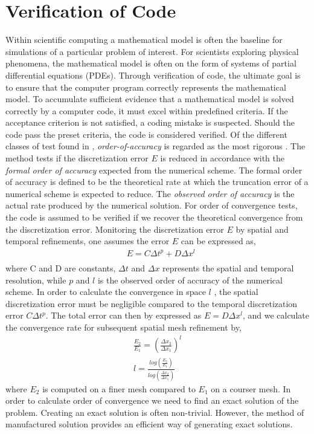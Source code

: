 \section{Verification of Code}
Within scientific computing a mathematical model is often the baseline for simulations of a particular problem of interest. For scientists exploring physical phenomena, the mathematical model is often on the form of systems of partial differential equations (PDEs). Through verification of code, the ultimate goal is to ensure that the computer program correctly represents the mathematical model. To accumulate sufficient evidence that a mathematical model is solved correctly by a computer code, it must excel within predefined criteria. If the acceptance criterion is not satisfied, a coding mistake is suspected. Should the code pass the preset criteria, the code is considered verified. Of the different classes of test found in \cite{Roache},  \textit{order-of-accuracy} is regarded as the most rigorous  \cite{Biggs, Roache, Etienne2006}. The method tests if the discretization error $E$ is reduced in accordance with the \textit{formal order of accuracy} expected from the numerical scheme. The formal order of accuracy is defined to be the theoretical rate at which the truncation error of a numerical scheme is expected to reduce. The \textit{observed order of accuracy} is the actual rate produced by the numerical solution.
For order of convergence tests, the code is assumed to be verified if we recover the theoretical convergence from the discretization error. Monitoring the discretization error $E$ by spatial and temporal refinements, one assumes the error $E$ can be expressed as,
\begin{align*}
&E = C\Delta t^p + D\Delta x^l\\
\end{align*} 
where C and D are constants, $\Delta t$ and $\Delta x$ represents the spatial and temporal resolution, while $p$ and $l$ is the observed order of accuracy of the numerical scheme. 
In order to calculate the convergence in space $l$ , the spatial discretization error must be negligible compared to the temporal discretization error $C\Delta t^p$. The total error can then by expressed as $E =  D\Delta x^l$, and we calculate the convergence rate for subsequent spatial mesh refinement by,
\begin{align}
\frac{E_2}{E_1} = (\frac{\Delta x_2}{\Delta x_1})^l \\
l = \frac{log (\frac{E_2}{E_1})}{ log (\frac{\Delta x_2}{\Delta x_1}) }
\end{align}
where $E_2$ is computed on a finer mesh compared to $E_1$ on a courser mesh. In order to calculate order of convergence we need to find an exact solution of the problem. Creating an exact solution is often non-trivial. However, the method of manufactured solution provides an efficient way of generating exact solutions.
